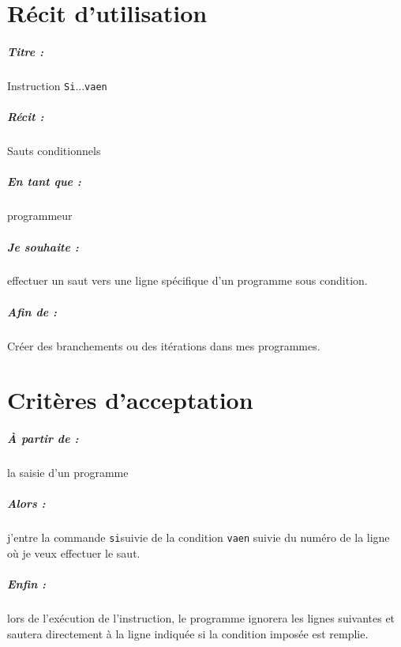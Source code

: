 \documentclass[12pt,a5paper, notitle, oneside]{report}
\begin{document}
	
	\chapter*{Récit d'utilisation}
	
	\paragraph{Titre : } Instruction \verb|Si|...\verb|vaen|
	\paragraph{Récit : } Sauts conditionnels
	\paragraph{En tant que : } programmeur
	\paragraph{Je souhaite : } effectuer un saut vers une ligne
	spécifique d'un programme sous condition.
	\paragraph{Afin de : } Créer des branchements ou des itérations
	dans mes programmes.
	\newpage
	
	\chapter*{Critères d'acceptation}
	
	\paragraph{À partir de : } la saisie d'un programme
	\paragraph{Alors : } j'entre la commande \verb|si|suivie de  la condition  \verb|vaen| suivie du numéro
	de la ligne où je veux effectuer le saut.
	\paragraph{Enfin : } lors de l'exécution de l'instruction, le programme
	ignorera les lignes suivantes et sautera directement à la ligne
	indiquée si la condition imposée est remplie.
	
\end{document}
